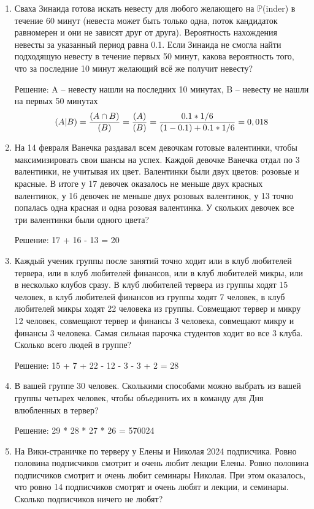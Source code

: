 \documentclass[12pt]{article}
\let\P\relax
\DeclareMathOperator{\P}{\mathbb{P}}
\begin{document}
\begin{enumerate}

\item Сваха Зинаида готова искать невесту для любого желающего на $\mathbb{P}$(inder) в течение 60 минут (невеста может быть только одна, поток кандидаток равномерен и они не зависят друг от друга). Вероятность нахождения невесты за указанный период равна 0.1. Если Зинаида не смогла найти подходящую невесту в течение первых 50 минут, какова вероятность того, что за последние 10 минут желающий всё же получит невесту?

Решение: 
A -- невесту нашли на последних 10 минутах,
B -- невесту не нашли на первых 50 минутах
\[ 
\P(A|B) = \frac{\P(A \cap B)}{\P(B)} = \frac{\P(A)}{\P(B)} = \frac{0.1 * 1/6}{ (1 - 0.1) + 0.1 * 1/6} = 0,018
\]

\item На 14 февраля Ванечка раздавал всем девочкам  готовые валентинки, чтобы максимизировать свои шансы на успех. Каждой девочке Ванечка отдал по 3 валентинки, не учитывая их цвет. Валентинки были двух цветов: розовые и красные.  В итоге у 17 девочек оказалось не меньше двух красных валентинок, у 16 девочек не меньше двух розовых валентинок, у 13 точно попалась одна красная и одна розовая валентинка. У скольких девочек все три валентинки были одного цвета? 

Решение: 17 + 16 - 13 = 20

\item Каждый ученик группы после занятий точно ходит или в клуб любителей тервера, или  в клуб любителей финансов, или в клуб любителей микры, или в несколько клубов сразу. В клуб любителей тервера из группы ходят 15 человек, в клуб любителей финансов из группы ходят 7 человек, в клуб любителей микры ходят 22 человека из группы. Совмещают тервер и микру 12 человек, совмещают тервер и финансы 3 человека, совмещают микру и финансы 3 человека. Самая сильная парочка студентов ходит во все 3 клуба. Сколько всего людей в группе?

Решение: 15 + 7 + 22 - 12 - 3 - 3 + 2 = 28

\item В вашей группе 30 человек. 
Сколькими способами можно выбрать из вашей группы четырех человек, чтобы объединить их в команду для Дня влюбленных в тервер? 

 Решение: 29 * 28 * 27 * 26 = 570024 

\item На Вики-страничке по терверу у Елены и Николая 2024 подписчика. 
Ровно половина подписчиков смотрит и очень любит лекции Елены. 
Ровно половина подписчиков смотрит и очень любит семинары Николая. 
При этом оказалось, что ровно 14 подписчиков смотрят и очень любят и лекции, и семинары. Сколько подписчиков ничего не любят?


\end{enumerate}
\end{document}
